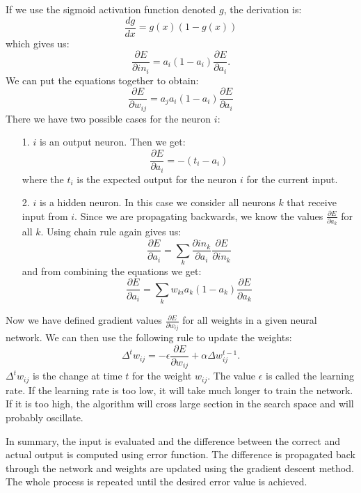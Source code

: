If we use the sigmoid activation function denoted $g$, the derivation is:
\begin{equation*}
\frac{dg}{dx}  =  g(x)(1-g(x))
\end{equation*}
which gives us:
\begin{equation*}
\frac{\partial E}{\partial in_{i}} = a_{i}(1-a_{i}) \frac{\partial E}{\partial a_{i}}.
\end{equation*}
We can put the equations together to obtain:
\begin{equation*}
\frac{\partial E}{\partial w_{ij}} = a_{j} a_{i}(1-a_{i}) \frac{\partial E}{\partial a_{i}}
\end{equation*}
There we have two possible cases for the neuron $i$:
\begin{enumerate}
\item [1.] $i$ is an output neuron. Then we get: 
	\[
	\frac{\partial E}{\partial a_{i}} = -(t_{i} - a_{i})
	\]
	where the $t_{i}$ is the expected output for the neuron $i$ for the current input.

\item [2.] $i$ is a hidden neuron. In this case we consider all neurons $k$ that receive input from $i$. Since we are propagating backwards, we know the values $\frac{\partial E}{\partial a_{k}}$ for all $k$. Using chain rule again gives us:
	\[
	\frac{\partial E}{\partial a_{i}} = \sum_{k} \frac{\partial in_{k}}{\partial a_{i}} \frac{\partial E}{\partial in_{k}}
	\]
and from combining the equations we get:
	\[
	\frac{\partial E}{\partial a_{i}} = \sum_{k} w_{ki}a_{k}(1-a_{k}) \frac{\partial E}{\partial a_{k}}
	\]
\end{enumerate}
Now we have defined gradient values $\frac{\partial E}{\partial w_{ij}}$ for all weights in a given neural network.
We can then use the following rule to update the weights:
\[
\Delta^{t} w_{ij} = - \epsilon \frac {\partial E}{\partial w_{ij}} + \alpha \Delta w^{t-1}_{ij}.
\]
$\Delta^{t} w_{ij}$ is the change at time $t$ for the weight $w_{ij}$. The value $\epsilon$ is called the learning rate. If the learning rate is too low, it will take much longer to train the network. If it is too high, the algorithm will cross large section in the search space and will probably oscillate.

In summary, the input is evaluated and the difference between the correct and actual output is computed using error function. The difference is propagated back through the network and weights are updated using the gradient descent method. The whole process is repeated until the desired error value is achieved.

